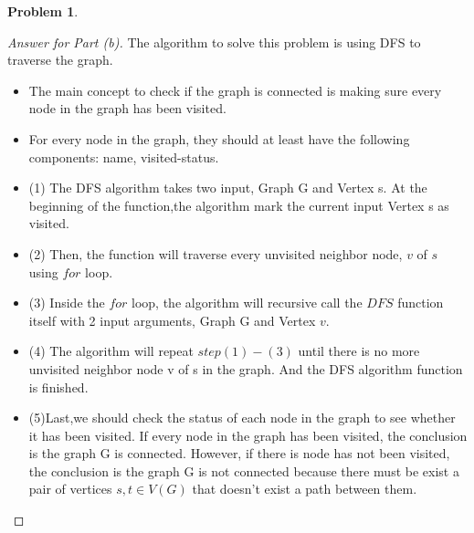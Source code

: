 \documentclass[11pt]{article}
\theoremstyle{definition}
\theoremstyle{definition}
\newtheorem{required}{Problem}
\theoremstyle{definition}
\begin{document}
\begin{required}
\begin{enumerate}[label=(\alph*)]
\begin{proof}[Answer for Part (b)]
The algorithm to solve this problem is using DFS to traverse the graph.
\begin{itemize}
\item The main concept to check if the graph is connected is making sure every node in the graph has been visited.
\item For every node in the graph, they should at least have the following components: name, visited-status.
\item (1) The DFS algorithm takes two input, Graph G and Vertex s. At the beginning of the function,the algorithm mark the current input Vertex s as visited.
\item (2) Then, the function will traverse every unvisited neighbor node, $v$ of $s$ using $for$ loop.
\item (3) Inside the $for$ loop, the algorithm will recursive call the $DFS$ function itself with 2 input arguments, Graph G and Vertex $v$.
\item (4) The algorithm will repeat $step(1)-(3)$ until there is no more unvisited neighbor node v of s in the graph. And the DFS algorithm function is finished.
\item (5)Last,we should check the status of each node in the graph to see whether it has been visited. If every node in the graph has been visited, the conclusion is the graph G is connected. However, if there is node has not been visited, the conclusion is the graph G is not connected because there must be exist a pair of vertices $s,t\in V(G)$ that doesn't exist a path between them.


\end{itemize}
\end{proof}
\end{enumerate}
\end{required}






\newpage
\end{document}
